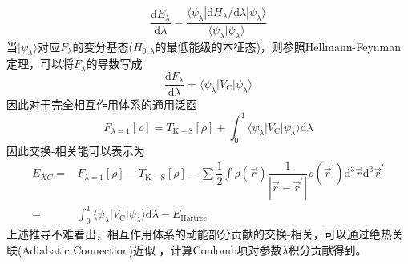 \begin{equation}
	\dfrac{\mathrm{d}E_{\lambda}}{\mathrm{d}\lambda}=\dfrac{\langle\psi_{\lambda}|\mathrm{d}H_{\lambda}/\mathrm{d}\lambda|\psi_{\lambda}\rangle}{\langle\psi_{\lambda}|\psi_{\lambda}\rangle}
	\label{eq:HF-QMD}
\end{equation}
当$|\psi_{\lambda}\rangle$对应$F_{\lambda}$的变分基态($H_{0,\lambda}$的最低能级的本征态)，则参照\textrm{Hellmann-Feynman}定理，可以将$F_{\lambda}$的导数写成
\begin{equation}
	\dfrac{\mathrm{d}F_{\lambda}}{\mathrm{d}\lambda}=\langle\psi_{\lambda}|V_\mathrm{C}|\psi_{\lambda}\rangle
	\label{eq:HF-F}
\end{equation}
因此对于完全相互作用体系的通用泛函
\begin{equation}
	F_{\lambda=1}[\rho]=T_{\mathrm{K-S}}[\rho]+\int_0^1\langle\psi_{\lambda}|V_{\mathrm{C}}|\psi_{\lambda}\rangle\mathrm{d}\lambda
	\label{eq:General-F}
\end{equation}
因此交换-相关能可以表示为
\begin{equation}
	\begin{aligned}
		E_{XC}=&F_{\lambda=1}[\rho]-T_{\mathrm{K-S}}[\rho]-\sum\dfrac12\int\rho(\vec r)\dfrac1{|\vec r-\vec r^{\prime}|}\rho(\vec r^{\prime})\mathrm{d}^3\vec r\mathrm{d}^3\vec r^{\prime}\\
		=&\int_0^1\langle\psi_{\lambda}|V_{\mathrm{C}}|\psi_{\lambda}\rangle\mathrm{d}\lambda-E_{\mathrm{Hartree}}
	\end{aligned}
	\label{eq:EX-delta}
\end{equation}
上述推导不难看出，相互作用体系的动能部分贡献的交换-相关，可以通过绝热关联\textrm{(Adiabatic Connection)}近似 ，计算\textrm{Coulomb}项对参数$\lambda$积分贡献得到。

